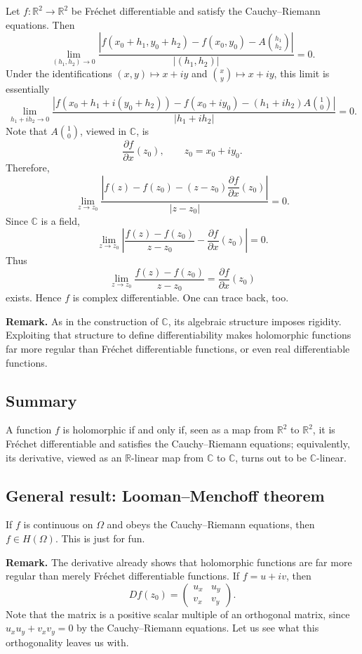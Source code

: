 \documentclass[11pt,a4paper]{article}
\begin{document}
Let $f\colon\mathbb R^2\to\mathbb R^2$ be Fr\'echet differentiable and satisfy the Cauchy--Riemann equations. Then
\[
\lim_{(h_1,h_2)\to0}
\frac{\left|f(x_0+h_1,y_0+h_2)-f(x_0,y_0)-A\binom{h_1}{h_2}\right|}
{|(h_1,h_2)|}=0.
\]
Under the identifications $(x,y)\mapsto x+iy$ and $\binom xy\mapsto x+iy$, this limit is essentially
\[
\lim_{h_1+ih_2\to0}
\frac{\left|f(x_0+h_1+i(y_0+h_2))-f(x_0+iy_0)
-(h_1+ih_2)A\binom10\right|}
{|h_1+ih_2|}=0.
\]
Note that $A\binom10$, viewed in $\mathbb C$, is
\[
\frac{\partial f}{\partial x}(z_0),
\qquad z_0=x_0+iy_0.
\]
Therefore,
\[
\lim_{z\to z_0}
\frac{\left|f(z)-f(z_0)-(z-z_0)\dfrac{\partial f}{\partial x}(z_0)\right|}
{|z-z_0|}=0.
\]
Since $\mathbb C$ is a field,
\[
\lim_{z\to z_0}
\left|\frac{f(z)-f(z_0)}{z-z_0}-
\frac{\partial f}{\partial x}(z_0)\right|=0.
\]
Thus
\[
\lim_{z\to z_0}\frac{f(z)-f(z_0)}{z-z_0}
=\frac{\partial f}{\partial x}(z_0)
\]
exists. Hence $f$ is complex differentiable. One can trace back, too.


\textbf{Remark.}
As in the construction of $\mathbb C$, its algebraic structure imposes rigidity. Exploiting that structure to define differentiability makes holomorphic functions far more regular than Fr\'echet differentiable functions, or even real differentiable functions.

\subsection*{Summary}
A function $f$ is holomorphic if and only if, seen as a map from $\mathbb R^2$ to $\mathbb R^2$, it is Fr\'echet differentiable and satisfies the Cauchy--Riemann equations; equivalently, its derivative, viewed as an $\mathbb R$-linear map from $\mathbb C$ to $\mathbb C$, turns out to be $\mathbb C$-linear.

\subsection*{General result: Looman--Menchoff theorem}
If $f$ is continuous on $\Omega$ and obeys the Cauchy--Riemann equations, then \(f\in H(\Omega).\)
This is just for fun.

\textbf{Remark.}
The derivative already shows that holomorphic functions are far more regular than merely Fr\'echet differentiable functions. If $f=u+iv$, then
\[
Df(z_0)=
\begin{pmatrix}
u_x&u_y\\
v_x&v_y
\end{pmatrix}.
\]
Note that the matrix is a positive scalar multiple of an orthogonal matrix, since \(u_xu_y+v_xv_y=0\)
by the Cauchy--Riemann equations. Let us see what this orthogonality leaves us with.
\end{document}
